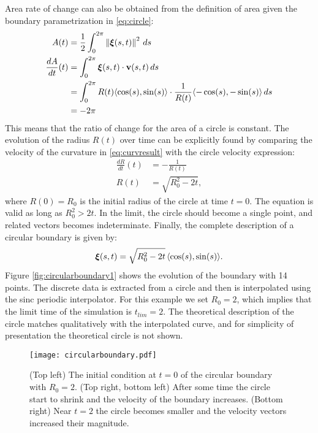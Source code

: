 Area rate of change can also be obtained from the definition of area given the boundary parametrization in \eqref{eq:circle}:
\begin{align}
    A(t) &= \frac{1}{2} \int_0^{2\pi} \left\lVert\bm{\xi}(s,t)\right\rVert^2\, ds\nonumber\\
    \dfrac{dA}{dt}(t) &= \int_0^{2\pi} \bm{\xi}(s,t)\cdot \mathbf{v}(s,t)\,ds \nonumber\\
    &= \int_0^{2\pi} R(t)\langle \cos(s),\sin(s)\rangle \cdot \frac{1}{R(t)} \langle -\cos(s),-\sin(s)\rangle \,ds \nonumber\\
    &= -2\pi \label{eq:dAdtcircle}
\end{align}
This means that the ratio of change for the area of a circle is constant. The evolution of the radius $R(t)$ over time can be explicitly found by comparing the velocity of the curvature in \eqref{eq:curvresult} with the circle velocity expression:
\begin{align}
    \frac{dR}{dt}(t) &= -\frac{1}{R(t)} \nonumber\\
    R(t) &= \sqrt{R_0^2 - 2t} \label{eq:radii},
\end{align}
where $R(0) = R_0$ is the initial radius of the circle at time $t=0$. The equation is valid as long as $R_0^2 > 2t$. In the limit, the circle should become a single point, and related vectors becomes indeterminate. Finally, the complete description of a circular boundary is given by:
\begin{equation}
    \bm{\xi}(s,t) = \sqrt{R_0^2 - 2t}\,\langle \cos(s), \sin(s) \rangle.
\end{equation}
Figure \ref{fig:circularboundary1} shows the evolution of the boundary with 14 points. The discrete data is extracted from a circle and then is interpolated using the sinc periodic interpolator. For this example we set $R_0 = 2$, which implies that the limit time of the simulation is $t_{lim}=2$. The theoretical description of the circle matches qualitatively with the interpolated curve, and for simplicity of presentation the theoretical circle is not shown. 

\begin{figure}[ht]
    \centering
    \texttt{[image: circularboundary.pdf]}
    \caption[Circular boundary evolution]{(Top left) The initial condition at $t=0$ of the circular boundary with $R_0 = 2$. (Top right, bottom left) After some time the circle start to shrink and the velocity of the boundary increases. (Bottom right) Near $t=2$ the circle becomes smaller and the velocity vectors increased their magnitude.}
    \label{fig:circularboundary}
\end{figure}


